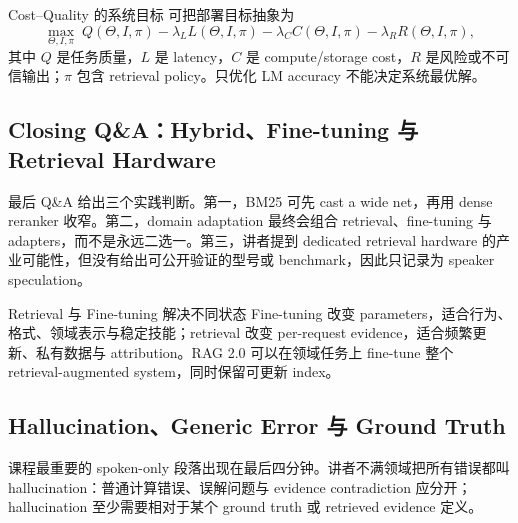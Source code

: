 
\begin{importantbox}{Cost--Quality 的系统目标}
可把部署目标抽象为
\[
\max_{\Theta,I,\pi}\;
Q(\Theta,I,\pi)
-\lambda_L L(\Theta,I,\pi)
-\lambda_C C(\Theta,I,\pi)
-\lambda_R R(\Theta,I,\pi),
\]
其中 $Q$ 是任务质量，$L$ 是 latency，$C$ 是 compute/storage cost，$R$ 是风险或不可信输出；$\pi$ 包含 retrieval policy。只优化 LM accuracy 不能决定系统最优解。
\end{importantbox}


\subsection{Closing Q\&A：Hybrid、Fine-tuning 与 Retrieval Hardware}

最后 Q\&A 给出三个实践判断。第一，BM25 可先 cast a wide net，再用 dense reranker 收窄。第二，domain adaptation 最终会组合 retrieval、fine-tuning 与 adapters，而不是永远二选一。第三，讲者提到 dedicated retrieval hardware 的产业可能性，但没有给出可公开验证的型号或 benchmark，因此只记录为 speaker speculation。

\begin{knowledgebox}{Retrieval 与 Fine-tuning 解决不同状态}
Fine-tuning 改变 parameters，适合行为、格式、领域表示与稳定技能；retrieval 改变 per-request evidence，适合频繁更新、私有数据与 attribution。RAG 2.0 可以在领域任务上 fine-tune 整个 retrieval-augmented system，同时保留可更新 index。
\end{knowledgebox}


\subsection{Hallucination、Generic Error 与 Ground Truth}

课程最重要的 spoken-only 段落出现在最后四分钟。讲者不满领域把所有错误都叫 hallucination：普通计算错误、误解问题与 evidence contradiction 应分开；hallucination 至少需要相对于某个 ground truth 或 retrieved evidence 定义。

